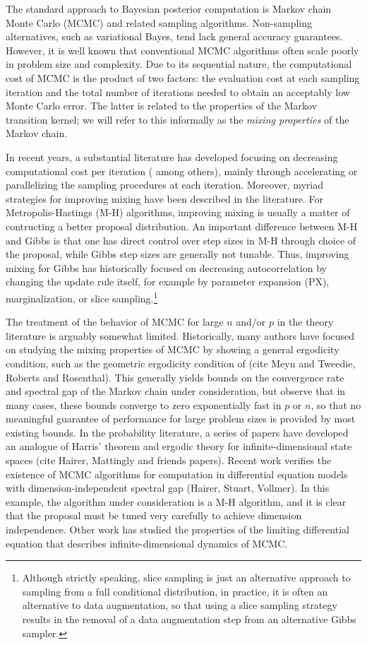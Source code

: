 \documentclass[10pt]{article}
\begin{document}
The standard approach to Bayesian posterior computation is Markov chain Monte Carlo (MCMC) and related sampling algorithms. Non-sampling alternatives, such as variational Bayes, tend lack general accuracy guarantees. However, it is well known that conventional MCMC algorithms often scale poorly in problem size and complexity. Due to its sequential nature, the computational cost of MCMC is the product of two factors: the evaluation cost at each sampling iteration and the total number of iterations needed to obtain an acceptably low Monte Carlo error. The latter is related to the properties of the Markov transition kernel; we will refer to this informally as the \emph{mixing properties} of the Markov chain. 

In recent years, a substantial literature has developed focusing on decreasing computational cost per iteration (\cite{minsker2014robust,srivastava2015wasp,conrad2015accelerating} among others), mainly through accelerating or parallelizing the sampling procedures at each iteration. Moreover, myriad strategies for improving mixing have been described in the literature. For Metropolis-Hastings (M-H) algorithms, improving mixing is usually a matter of contructing a better proposal distribution. An important difference between M-H and Gibbs is that one has direct control over step sizes in M-H through choice of the proposal, while Gibbs step sizes are generally not tunable. Thus, improving mixing for Gibbs has historically focused on decreasing autocorrelation by changing the update rule itself, for example by parameter expansion (PX), marginalization, or slice sampling.\footnote{Although strictly speaking, slice sampling is just an alternative approach to sampling from a full conditional distribution, in practice, it is often an alternative to data augmentation, so that using a slice sampling strategy results in the removal of a data augmentation step from an alternative Gibbs sampler.} 

The treatment of the behavior of MCMC for large $n$ and/or $p$ in the theory literature is arguably somewhat limited. Historically, many authors have focused on studying the mixing properties of MCMC by showing a general ergodicity condition, such as the geometric ergodicity condition of (cite Meyn and Tweedie, Roberts and Rosenthal). This generally yields bounds on the convergence rate and spectral gap of the Markov chain under consideration, but \cite{rajaratnam2015mcmc} observe that in many cases, these bounds converge to zero exponentially fast in $p$ or $n$, so that no meaningful guarantee of performance for large problem sizes is provided by most existing bounds. In the probability literature, a series of papers have developed an analogue of Harris' theorem and ergodic theory for infinite-dimensional state spaces (cite Hairer, Mattingly and friends papers). Recent work verifies the existence of MCMC algorithms for computation in differential equation models with dimension-independent spectral gap (Hairer, Stuart, Vollmer). In this example, the algorithm under consideration is a M-H algorithm, and it is clear that the proposal must be tuned very carefully to achieve dimension independence. Other work has studied the properties of the limiting differential equation that describes infinite-dimensional dynamics of MCMC.
\end{document}
